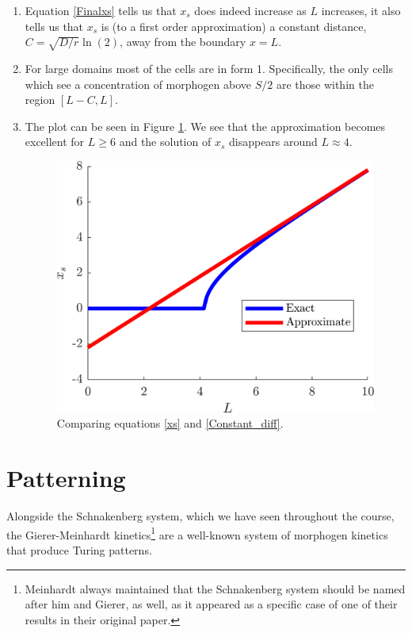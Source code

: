 \documentclass[10pt]{article}
\newcommand{\fig}[1]{Figure \ref{#1}}
\newcommand{\eqns}[2]{equations \eqref{#1} and \eqref{#2}}
\newcommand{\ttp}{.45\textwidth}
\renewcommand{\l}{\left(}
\renewcommand{\r}{\right)}
\begin{document}
\begin{Answ}
\begin{enumerate}
\item Equation \eqref{Finalxs} tells us that $x_s$ does indeed increase as $L$ increases, it also tells us that $x_s$ is (to a first order approximation) a constant distance, $C=\sqrt{D/r}\ln\l 2\r$, away from the boundary $x=L$.

\item For large domains most of the cells are in form 1. Specifically, the only cells which see a concentration of morphogen above $S/2$ are those within the region $[L-C,L]$.

\item The plot can be seen in \fig{Exact_approximate}. We see that the approximation becomes excellent for $L\geq 6$ and the solution of $x_s$ disappears around  $L\approx 4$.
\begin{figure}[h!!!tb]
\centering
\includegraphics[width=\ttp]{../../Pictures/Exact_approximate.png}
\caption{\label{Exact_approximate} Comparing \eqns{xs}{Constant_diff}.}
\end{figure}
\end{enumerate}
\end{Answ}

\section{Patterning}
Alongside the Schnakenberg system, which we have seen throughout the course, the Gierer-Meinhardt kinetics\footnote{Meinhardt always maintained that the Schnakenberg system should be named after him and Gierer, as well, as it appeared as a specific case of one of their results in their original paper.} are a well-known system of morphogen kinetics that produce Turing patterns. 
\end{document}
